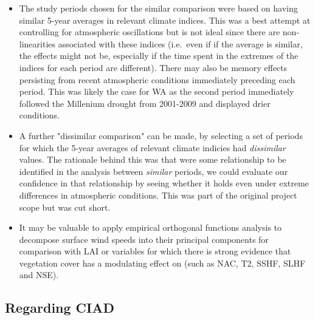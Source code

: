 \begin{itemize}
	\item The study periods chosen for the similar comparison were based on having similar 5-year averages in relevant climate indices. This was a best attempt at controlling for atmospheric oscillations but is not ideal since there are non-linearities associated with these indices (i.e.\ even if if the average is similar, the effects might not be, especially if the time spent in the extremes of the indices for each period are different). There may also be memory effects persisting from recent atmospheric conditions immediately preceding each period. This was likely the case for \ac{WA} as the second period immediately followed the Millenium drought from 2001-2009 and displayed drier conditions.
	\item A further "dissimilar comparison" can be made, by selecting a set of periods for which the 5-year averages of relevant climate indicies had \textit{dissimilar} values. The rationale behind this was that were some relationship to be identified in the analysis between \textit{similar} periods, we could evaluate our confidence in that relationship by seeing whether it holds even under extreme differences in atmospheric conditions. This was part of the original project scope but was cut short.
	\item It may be valuable to apply empirical orthogonal functions analysis to decompose surface wind speeds into their principal components for comparison with \ac{LAI} or variables for which there is strong evidence that vegetation cover has a modulating effect on (such as \ac{NAC}, \ac{T2}, \ac{SSHF}, \ac{SLHF} and \ac{NSE}).
\end{itemize}

\subsection{Regarding CIAD}

